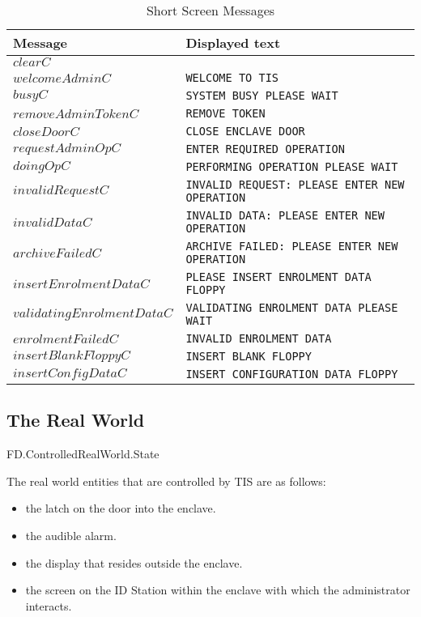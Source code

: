 \begin{table}[h]
\begin{tabular}{|l|l|}
{\bf Message}   &  {\bf Displayed text}   \\
\hline
$clearC$                 &                               \\
$welcomeAdminC$          & {\tt WELCOME TO TIS}          \\
$busyC$                  & {\tt SYSTEM BUSY PLEASE WAIT} \\ 
$removeAdminTokenC$      & {\tt REMOVE TOKEN} \\
$closeDoorC$             & {\tt CLOSE ENCLAVE DOOR} \\
$requestAdminOpC$        & {\tt ENTER REQUIRED OPERATION} \\
$doingOpC$               & {\tt PERFORMING OPERATION PLEASE WAIT} \\
$invalidRequestC$        & {\tt INVALID REQUEST: PLEASE ENTER NEW
OPERATION} \\
$invalidDataC$           & {\tt INVALID DATA: PLEASE ENTER NEW
OPERATION} \\
$archiveFailedC$         & {\tt ARCHIVE FAILED: PLEASE ENTER NEW
OPERATION} \\
$insertEnrolmentDataC$   & {\tt PLEASE INSERT ENROLMENT DATA FLOPPY} \\
$validatingEnrolmentDataC$ & {\tt VALIDATING ENROLMENT DATA PLEASE WAIT
} \\
$enrolmentFailedC$       & {\tt INVALID ENROLMENT DATA} \\
$insertBlankFloppyC$     & {\tt INSERT BLANK FLOPPY} \\
$insertConfigDataC$      & {\tt INSERT CONFIGURATION DATA FLOPPY} \\
\hline
\end{tabular}
\caption{Short Screen Messages}
\label{tab:screen}
\end{table}

\subsection{The Real World}
\begin{traceunit}{FD.ControlledRealWorld.State}
\end{traceunit}

The real world entities that are controlled by TIS are as follows:
\begin{itemize}
\item the latch on the door into the enclave.
\item the audible alarm.
\item the display that resides outside the enclave.
\item the screen on the ID Station within the enclave with
which the administrator interacts.
\end{itemize}

